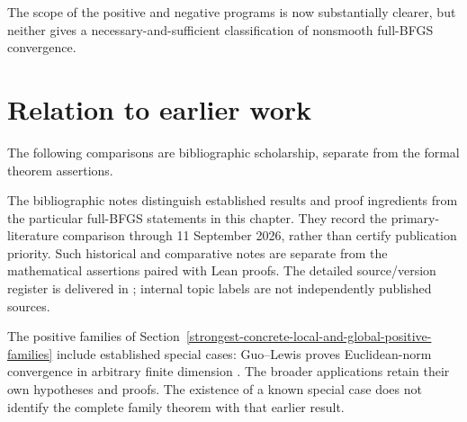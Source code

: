 The scope of the positive and negative programs is now substantially clearer, but neither gives a necessary-and-sufficient classification of nonsmooth full-BFGS convergence.


\section*{Relation to earlier work}
The following comparisons are bibliographic scholarship, separate from the formal theorem assertions.

The bibliographic notes distinguish established results and proof ingredients from the particular full-BFGS statements in this chapter. They record the primary-literature comparison through 11 September 2026, rather than certify publication priority. Such historical and comparative notes are separate from the mathematical assertions paired with Lean proofs. The detailed source/version register is delivered in ; internal topic labels are not independently published sources.

The positive families of Section~\ref{strongest-concrete-local-and-global-positive-families} include established special cases: Guo--Lewis proves Euclidean-norm convergence in arbitrary finite dimension \cite[Corollary 4.2]{GL18}. The broader applications retain their own hypotheses and proofs. The existence of a known special case does not identify the complete family theorem with that earlier result.

